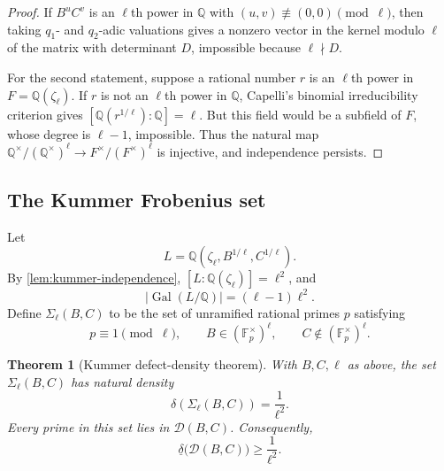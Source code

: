 \documentclass[11pt]{article}
\newtheorem{theorem}{Theorem}[section]
\theoremstyle{definition}
\newcommand{\Q}{\mathbb Q}
\newcommand{\F}{\mathbb F}
\newcommand{\Gal}{\operatorname{Gal}}
\newcommand{\Def}{\mathcal D}
\begin{document}
\begin{proof}
If $B^uC^v$ is an $\ell$th power in $\Q$ with $(u,v)\not\equiv(0,0)\pmod\ell$, then taking
$q_1$- and $q_2$-adic valuations gives a nonzero vector in the kernel modulo $\ell$ of the
matrix with determinant $D$, impossible because $\ell\nmid D$.

For the second statement, suppose a rational number $r$ is an $\ell$th power in
$F=\Q(\zeta_\ell)$.  If $r$ is not an $\ell$th power in $\Q$, Capelli's binomial
irreducibility criterion gives $[\Q(r^{1/\ell}):\Q]=\ell$.  But this field would be a
subfield of $F$, whose degree is $\ell-1$, impossible.  Thus the natural map
$\Q^\times/(\Q^\times)^\ell\to F^\times/(F^\times)^\ell$ is injective, and independence
persists.
\end{proof}

\subsection{The Kummer Frobenius set}

Let
\begin{equation}
 L=\Q(\zeta_\ell,B^{1/\ell},C^{1/\ell}).
 \label{eq:kummer-field}
\end{equation}
By \cref{lem:kummer-independence},
$[L:\Q(\zeta_\ell)]=\ell^2$, and
\[
 |\Gal(L/\Q)|=(\ell-1)\ell^2.
\]
Define $\Sigma_\ell(B,C)$ to be the set of unramified rational primes $p$ satisfying
\begin{equation}
 p\equiv1\pmod\ell,
 \qquad
 B\in(\F_p^\times)^\ell,
 \qquad
 C\notin(\F_p^\times)^\ell.
 \label{eq:kummer-set}
\end{equation}

\begin{theorem}[Kummer defect-density theorem]
\label{thm:kummer-density}
With $B,C,\ell$ as above, the set $\Sigma_\ell(B,C)$ has natural density
\begin{equation}
 \delta(\Sigma_\ell(B,C))=\frac1{\ell^2}.
 \label{eq:density-one-over-l2}
\end{equation}
Every prime in this set lies in $\Def(B,C)$.  Consequently,
\begin{equation}
 \underline\delta\bigl(\Def(B,C)\bigr)\ge\frac1{\ell^2}.
 \label{eq:defect-density-lower}
\end{equation}
\end{theorem}
\end{document}
